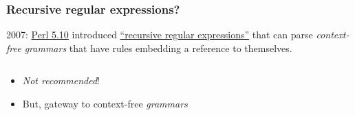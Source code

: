 \begin{frame}[fragile]
  \frametitle{Recursive regular expressions?}

  2007: \href{http://dev.perl.org/perl5/news/2007/perl-5.10.0.html}{Perl 5.10} introduced \href{http://www.catonmat.net/blog/recursive-regular-expressions/}{``recursive regular expressions''} that can parse \emph{context-free grammars} that have rules embedding a reference to themselves.

  \inputminted{perl}{extra/parens.pl}

  \begin{itemize}
    \item \emph{Not recommended}!
    \item But, gateway to context-free \emph{grammars}
  \end{itemize}
\end{frame}
